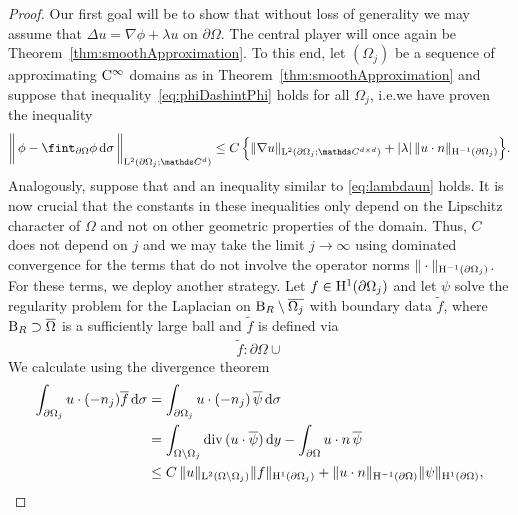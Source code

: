 \begin{proof}
  {
  Our first goal will be to show that without loss of generality we may assume that $\Delta u = \nabla \phi + \lambda u$ on $\partial\Omega$.
  The central player will once again be Theorem~\ref{thm:smoothApproximation}.
  To this end, let $(\Omega_j)$ be a sequence of approximating $\mathrm{C}^\infty$ domains as in Theorem~\ref{thm:smoothApproximation} and suppose that inequality~\eqref{eq:phiDashintPhi} holds for all $\Omega_j$, i.e.\@ we have proven the inequality
  \begin{align*}
    \bigg\|\, \phi - \fint_{\partial\Omega} \phi \d\sigma  \, \bigg\|_{\Ell^2(\partial\Omega_j; \C^d)}
     \leq C\, \Big\{ \|\nabla u\|_{\Ell^2(\partial\Omega_j; \C^{d\times d})} + |\lambda| \, \|u\cdot n\|_{\HH^{-1}(\partial\Omega_j)} \Big\}.
  \end{align*}
  Analogously, suppose that and an inequality similar to \eqref{eq:lambdaun} holds.
  It is now crucial that the constants in these inequalities only depend on the Lipschitz character of $\Omega$ and not on other geometric properties of the domain.
  Thus, $C$ does not depend on $j$ and we may take the limit $j \to \infty$ using dominated convergence for the terms that do not involve the operator norms $\| \cdot \|_{\mathrm{H}^{-1}(\partial\Omega_j)}$. 
  For these terms, we deploy another strategy.
  Let $f \in \mathrm{H}^1(\partial\Omega_j)$ and let $\psi$ solve the regularity problem for the Laplacian on $\mathrm{B}_R \setminus \overline{\Omega_j}$ with boundary data $\tilde f$, where $\mathrm{B}_R \supset \overline\Omega$ is a sufficiently large ball and $\tilde f$ is defined via
  \begin{align*}
    \tilde f \colon \partial\Omega \cup 
  \end{align*}
  We calculate using the divergence theorem
  \begin{align}
    \int_{\partial\Omega_j} u \cdot (-n_j) \overline f \d\sigma
    &= \int_{\partial\Omega_j} u \cdot (-n_j) \, \overline \psi \d \sigma \nonumber\\
    &= \int_{\Omega \setminus \Omega_j} \div(u \cdot \overline\psi) \d y - \int_{\partial\Omega} u\cdot n \, \overline \psi \nonumber\\
    &\leq C\, \|u\|_{\Ell^2(\Omega \setminus \Omega_j)} \|f\|_{\HH^1(\partial\Omega_j)} + \|u \cdot n\|_{\HH^{-1}(\partial\Omega)} \|\psi\|_{\HH^1(\partial\Omega)}, \label{eq:operatornormApprox}

\end{align}}
\end{proof}
